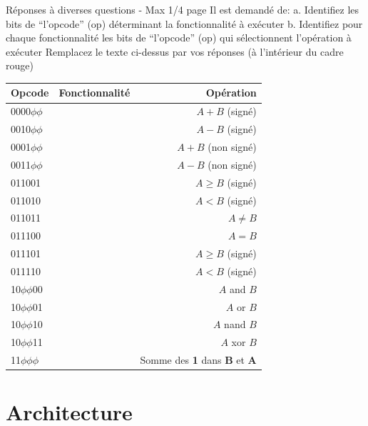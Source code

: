 \documentclass[a4paper]{article}
\begin{document}
	
\begin{tcolorbox}[colframe=Monokaimagenta,colback=white]
Réponses à diverses questions - Max 1/4 page 
Il est demandé de: 
a. Identifiez les bits de “l’opcode” (op) déterminant la fonctionnalité à exécuter
b. Identifiez pour chaque fonctionnalité les bits de “l’opcode” (op) qui sélectionnent l’opération à exécuter
Remplacez le texte ci-dessus par vos réponses (à l’intérieur du cadre rouge)\\
\begin{center}
    
\begin{tabular}{ l | c |r }
    \hline
    Opcode           &  Fonctionnalité & Opération\\
    \hline
    0000$\phi\phi$   &     \nameref{add_Sub}    & $A+B$ (signé) \\
    0010$\phi\phi$   &                 & $A-B$ (signé) \\
    0001$\phi\phi$   &                 & $A+B$ (non signé) \\
    0011$\phi\phi$   &                 & $A-B$ (non signé) \\
    \hline
    011001           &  \nameref{comp} & $A \ge B$ (signé) \\
    011010           &                 & $A < B$ (signé) \\
    011011           &                 & $A \ne B$\\
    011100           &                 & $A = B$ \\
    011101           &                 & $A \ge B$ (signé) \\
    011110           &                 & $A < B$ (signé) \\
    \hline
    10$\phi\phi$00   &\nameref{logique}& $A$ and $B$\\
    10$\phi\phi$01   &                 & $A$ or $B$\\
    10$\phi\phi$10   &                 & $A$ nand $B$\\
    10$\phi\phi$11   &                 & $A$ xor $B$\\
    \hline
    11$\phi\phi\phi$ & \nameref{custom}& Somme des \textbf{1} dans \textbf{B} et \textbf{A}
     
\end{tabular}

\end{center}

\end{tcolorbox}

\section{Architecture}
\end{document}
